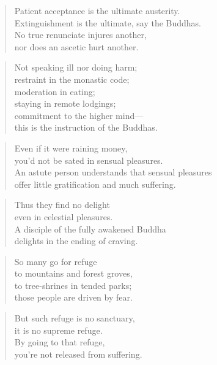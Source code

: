 \documentclass[12pt,openany]{book}%
\begin{document}
\begin{verse}%
Patient acceptance is the ultimate austerity. \\
Extinguishment is the ultimate, say the Buddhas. \\
No true renunciate injures another, \\
nor does an ascetic hurt another. 

%
\end{verse}

\begin{verse}%
Not speaking ill nor doing harm; \\
restraint in the monastic code; \\
moderation in eating; \\
staying in remote lodgings; \\
commitment to the higher mind—\\
this is the instruction of the Buddhas. 

%
\end{verse}

\begin{verse}%
Even if it were raining money, \\
you’d not be sated in sensual pleasures. \\
An astute person understands that sensual pleasures \\
offer little gratification and much suffering. 

%
\end{verse}

\begin{verse}%
Thus they find no delight \\
even in celestial pleasures. \\
A disciple of the fully awakened Buddha \\
delights in the ending of craving. 

%
\end{verse}

\begin{verse}%
So many go for refuge \\
to mountains and forest groves, \\
to tree-shrines in tended parks; \\
those people are driven by fear. 

%
\end{verse}

\begin{verse}%
But such refuge is no sanctuary, \\
it is no supreme refuge. \\
By going to that refuge, \\
you’re not released from suffering. 

%
\end{verse}
\end{document}
